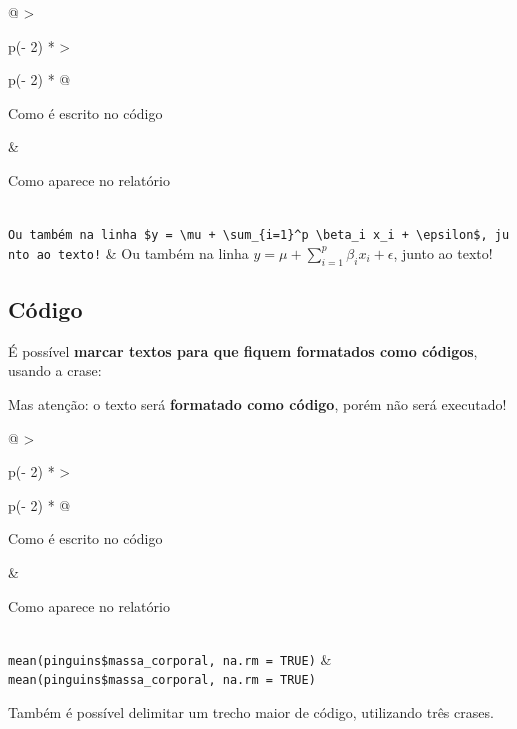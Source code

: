 \documentclass[
]{book}
\begin{document}
\begin{longtable}[]{@{}
  >{\raggedright\arraybackslash}p{(\columnwidth - 2\tabcolsep) * }
  >{\raggedright\arraybackslash}p{(\columnwidth - 2\tabcolsep) * }@{}}
\toprule\noalign{}
\begin{minipage}[b]{\linewidth}\raggedright
Como é escrito no código
\end{minipage} & \begin{minipage}[b]{\linewidth}\raggedright
Como aparece no relatório
\end{minipage} \\
\midrule\noalign{}
\endhead
\bottomrule\noalign{}
\endlastfoot
\texttt{Ou\ também\ na\ linha\ \$y\ =\ \textbackslash{}mu\ +\ \textbackslash{}sum\_\{i=1\}\^{}p\ \textbackslash{}beta\_i\ x\_i\ +\ \textbackslash{}epsilon\$,\ junto\ ao\ texto!} & Ou também na linha \(y = \mu + \sum_{i=1}^p \beta_i x_i + \epsilon\), junto ao texto! \\
\end{longtable}

\subsection{Código}\label{cuxf3digo}

É possível \textbf{marcar textos para que fiquem formatados como códigos}, usando a crase: \texttt{\textasciigrave{}}

Mas atenção: o texto será \textbf{formatado como código}, porém não será executado!

\begin{longtable}[]{@{}
  >{\raggedright\arraybackslash}p{(\columnwidth - 2\tabcolsep) * }
  >{\raggedright\arraybackslash}p{(\columnwidth - 2\tabcolsep) * }@{}}
\toprule\noalign{}
\begin{minipage}[b]{\linewidth}\raggedright
Como é escrito no código
\end{minipage} & \begin{minipage}[b]{\linewidth}\raggedright
Como aparece no relatório
\end{minipage} \\
\midrule\noalign{}
\endhead
\bottomrule\noalign{}
\endlastfoot
\texttt{\textasciigrave{}mean(pinguins\$massa\_corporal,\ na.rm\ =\ TRUE)\textasciigrave{}} & \texttt{mean(pinguins\$massa\_corporal,\ na.rm\ =\ TRUE)} \\
\end{longtable}

Também é possível delimitar um trecho maior de código, utilizando três crases.
\end{document}
